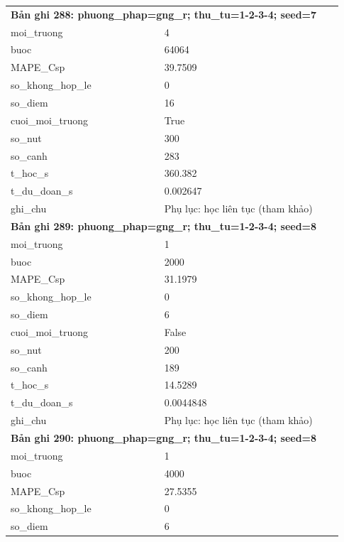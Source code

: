 \begin{longtable}{p{0.43\linewidth}p{0.50\linewidth}}
\midrule
\multicolumn{2}{p{0.95\linewidth}}{\textbf{Bản ghi 288: phuong\_phap=gng\_r; thu\_tu=1-2-3-4; seed=7}} \\
moi\_\allowbreak truong & 4 \\
buoc & 64064 \\
MAPE\_\allowbreak Csp & 39.7509 \\
so\_\allowbreak khong\_\allowbreak hop\_\allowbreak le & 0 \\
so\_\allowbreak diem & 16 \\
cuoi\_\allowbreak moi\_\allowbreak truong & True \\
so\_\allowbreak nut & 300 \\
so\_\allowbreak canh & 283 \\
t\_\allowbreak hoc\_\allowbreak s & 360.382 \\
t\_\allowbreak du\_\allowbreak doan\_\allowbreak s & 0.002647 \\
ghi\_\allowbreak chu & Phụ lục: học liên tục (tham khảo) \\
\midrule
\multicolumn{2}{p{0.95\linewidth}}{\textbf{Bản ghi 289: phuong\_phap=gng\_r; thu\_tu=1-2-3-4; seed=8}} \\
moi\_\allowbreak truong & 1 \\
buoc & 2000 \\
MAPE\_\allowbreak Csp & 31.1979 \\
so\_\allowbreak khong\_\allowbreak hop\_\allowbreak le & 0 \\
so\_\allowbreak diem & 6 \\
cuoi\_\allowbreak moi\_\allowbreak truong & False \\
so\_\allowbreak nut & 200 \\
so\_\allowbreak canh & 189 \\
t\_\allowbreak hoc\_\allowbreak s & 14.5289 \\
t\_\allowbreak du\_\allowbreak doan\_\allowbreak s & 0.0044848 \\
ghi\_\allowbreak chu & Phụ lục: học liên tục (tham khảo) \\
\midrule
\multicolumn{2}{p{0.95\linewidth}}{\textbf{Bản ghi 290: phuong\_phap=gng\_r; thu\_tu=1-2-3-4; seed=8}} \\
moi\_\allowbreak truong & 1 \\
buoc & 4000 \\
MAPE\_\allowbreak Csp & 27.5355 \\
so\_\allowbreak khong\_\allowbreak hop\_\allowbreak le & 0 \\
so\_\allowbreak diem & 6 \\

\end{longtable}
